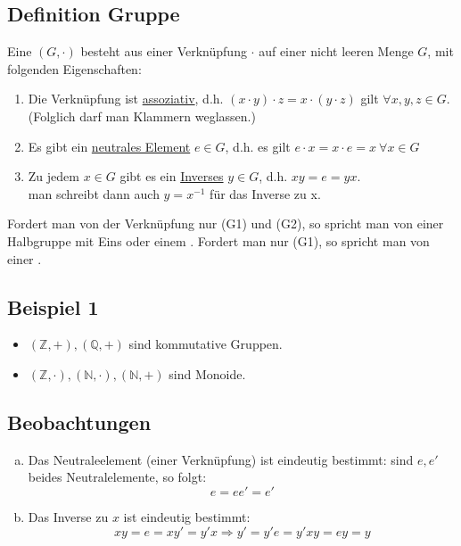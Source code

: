 \subsection{Definition Gruppe}
\label{sub:gef_gruppe}
Eine  $(G,\cdot )$ besteht aus einer Verknüpfung $\cdot $ auf einer nicht leeren Menge $G$, mit folgenden Eigenschaften:
\begin{enumerate}[(G1)]
	\item Die Verknüpfung ist \uline{assoziativ}, d.h. $(x\cdot y)\cdot z = x \cdot (y \cdot z)$ gilt $\forall x,y,z \in G$.\\ 
	(Folglich darf man Klammern weglassen.)
	\item Es gibt ein \uline{neutrales Element} $e \in G$, d.h. es gilt $e\cdot x= x\cdot e= x~ \forall x\in G$
	\item Zu jedem $x\in G$ gibt es ein \uline{Inverses} $y \in G$, d.h. $xy=e=yx.$\\
	man schreibt dann auch $y=x^{-1}$ für das Inverse zu x.
\end{enumerate}
Fordert man von der Verknüpfung nur (G1) und (G2), so spricht man von einer Halbgruppe mit Eins oder einem . 
Fordert man nur (G1), so spricht man von einer .\\

\subsection{Beispiel 1}
\label{sub:beispiel_1}
\begin{itemize}
	\item $(\mathds{Z}, +), (\mathds{Q}, +)$ sind kommutative Gruppen.
	\item $(\mathds{Z},\cdot), (\mathds{N},\cdot), (\mathds{N}, +)$ sind Monoide.
\end{itemize}

\subsection{Beobachtungen}
\label{sub:beobachtungen}
\begin{enumerate}[a)]
	\item Das Neutraleelement (einer Verknüpfung) ist eindeutig bestimmt: sind $e,e'$ beides Neutralelemente, so folgt: 
	\[
	e=ee'=e'
	\]
	\item Das Inverse zu $x$ ist eindeutig bestimmt:
	\[
	xy=e=xy'=y'x \Rightarrow y'=y'e=y'xy=ey=y
	\]
\end{enumerate}


